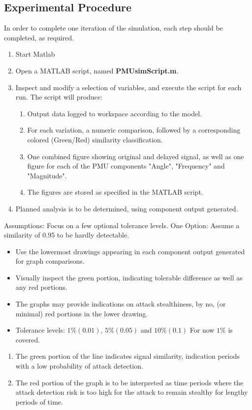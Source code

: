 \subsection{Experimental Procedure}
In order to complete one iteration of the simulation, each step should be completed, as required.
\begin{enumerate}
    \item Start Matlab
    \item Open a MATLAB script, named \textbf{PMUsimScript.m}.
    \item Inspect and modify a selection of variables, and execute the script for each run. The script will produce:
    \begin{enumerate}
    \item Output data logged to workspace according to the model.
    \item For each variation, a numeric comparison, followed by a corresponding colored (Green/Red) similarity classification.
    \item One combined figure showing original and delayed signal, as well as one figure for each of the PMU components "Angle", "Frequency" and "Magnitude".
    \item The figures are stored as specified in the MATLAB script.
    \end{enumerate}
    \item Planned analysis is to be determined, using component output generated. 
\end{enumerate}
Assumptions: 
Focus on a few optional tolerance levels. One Option: Assume a similarity of 0.95 to be hardly detectable.  
\begin{itemize}
    \item Use the lowermost drawings appearing in each component output generated for graph comparisons.
    \item Visually inspect the green portion, indicating tolerable difference as well as any red portions.
    \item The graphs may provide indications on attack stealthiness, by no, (or minimal) red portions in the lower drawing. 
    \item Tolerance levels: $1\% (0.01)$, $5\% (0.05)$ and $10\% (0.1)$ For now $1\%$ is covered.
\end{itemize}

\begin{enumerate}
    \item The green portion of the line indicates signal similarity, indication periods with a low probability of attack detection.
    \item The red portion of the graph is to be interpreted as time periods where the attack detection risk is too high for the attack to remain stealthy for lengthy periods of time.

\end{enumerate}
